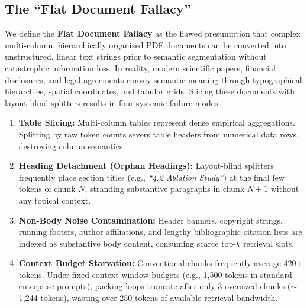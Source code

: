 \documentclass[conference]{IEEEtran}
\begin{document}
\subsection{The ``Flat Document Fallacy''}
We define the \textbf{Flat Document Fallacy} as the flawed presumption that complex multi-column, hierarchically organized PDF documents can be converted into unstructured, linear text strings prior to semantic segmentation without catastrophic information loss. In reality, modern scientific papers, financial disclosures, and legal agreements convey semantic meaning through typographical hierarchies, spatial coordinates, and tabular grids. Slicing these documents with layout-blind splitters results in four systemic failure modes:
\begin{enumerate}
    \item \textbf{Table Slicing:} Multi-column tables represent dense empirical aggregations. Splitting by raw token counts severs table headers from numerical data rows, destroying column semantics.
    \item \textbf{Heading Detachment (Orphan Headings):} Layout-blind splitters frequently place section titles (e.g., \textit{``4.2 Ablation Study''}) at the final few tokens of chunk $N$, stranding substantive paragraphs in chunk $N+1$ without any topical context.
    \item \textbf{Non-Body Noise Contamination:} Header banners, copyright strings, running footers, author affiliations, and lengthy bibliographic citation lists are indexed as substantive body content, consuming scarce top-$k$ retrieval slots.
    \item \textbf{Context Budget Starvation:} Conventional chunks frequently average 420+ tokens. Under fixed context window budgets (e.g., 1,500 tokens in standard enterprise prompts), packing loops truncate after only 3 oversized chunks ($\sim$1,244 tokens), wasting over 250 tokens of available retrieval bandwidth.
\end{enumerate}
\end{document}
